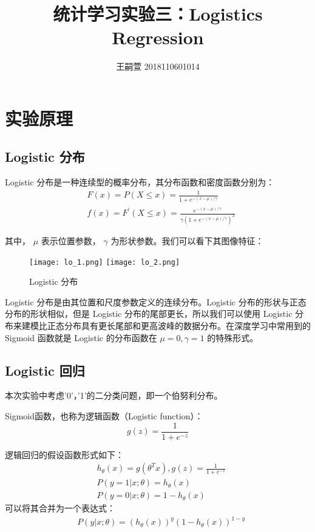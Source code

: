 \documentclass[lang=cn,12pt,a4paper,cite=authoryear]{elegantpaper}
\title{统计学习实验三：Logistics Regression}
\author{王嗣萱 2018110601014}
\date{}
\begin{document}
\maketitle

\section{实验原理}

\subsection{Logistic 分布}
Logistic 分布是一种连续型的概率分布，其分布函数和密度函数分别为：
\begin{equation}
	\begin{aligned}
		&F(x) = P(X \leq x)=\frac{1}{1+e^{-(x-\mu)/\gamma}} \\
		&f(x) = 	F^{'}(X \leq x)=\frac{e^{-(x-\mu)/\gamma}}{\gamma(1+e^{-(x-\mu)/\gamma})^{2}}
	\end{aligned}
\end{equation}

其中， $\mu$ 表示位置参数， $\gamma$ 为形状参数。我们可以看下其图像特征：

\begin{figure}[htbp]
	\centering
	\texttt{[image: lo\_1.png]}
	\texttt{[image: lo\_2.png]}
	\caption{Logistic 分布}
\end{figure}

Logistic 分布是由其位置和尺度参数定义的连续分布。Logistic 分布的形状与正态分布的形状相似，但是 Logistic 分布的尾部更长，所以我们可以使用 Logistic 分布来建模比正态分布具有更长尾部和更高波峰的数据分布。在深度学习中常用到的 Sigmoid 函数就是 Logistic 的分布函数在  $\mu=0, \gamma=1$ 的特殊形式。

\subsection{Logistic 回归}
本次实验中考虑'0'，'1'的二分类问题，即一个伯努利分布。

Sigmoid函数，也称为逻辑函数（Logistic function）：
\begin{equation}
	g(z)= \frac{1}{1+e^{-z}}
\end{equation}


逻辑回归的假设函数形式如下：
\begin{equation}
	\begin{aligned}
		&h_\theta(x) = g(\theta^T x), g(z)= \frac{1}{1+e^{-z}}
		\\
		&P(y=1|x;\theta)=h_{\theta}(x) 
		\\
		&P(y=0|x;\theta)=1-h_{\theta}(x)
	\end{aligned}
\end{equation}
可以将其合并为一个表达式：
\begin{equation}
	\begin{aligned}
		&P(y|x;\theta)=(h_{\theta}(x))^{y}(1-h_{\theta}(x))^{1-y}
	\end{aligned}
\end{equation}
\end{document}
